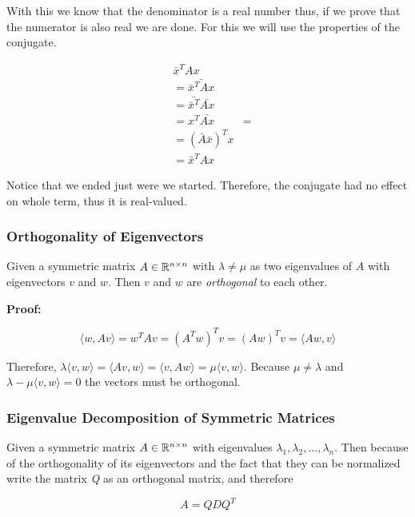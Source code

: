 With this we know that the denominator is a real number thus, if we prove that the numerator is also real 
we are done. For this we will use the properties of the conjugate.

\begin{align*}
    &\bar{x}^T A x\\
    &=\bar{\bar{x}^T A x} \\
    &=\bar{\bar{x}^T} \bar{Ax} \\
    &=x^T \bar{Ax} &= \\
    &=(\bar{A}\bar{x})^T x \\
    &=\bar{x}^T A  x 
\end{align*}

Notice that we ended just were we started. Therefore, the conjugate had no effect on whole term, thus 
it is real-valued.

\QED

\subsubsection{Orthogonality of Eigenvectors}

Given a symmetric matrix \(A \in \mathbb{R}^{n \times n}\) with \(\lambda \ne \mu \) as two eigenvalues of 
\(A\) with eigenvectors \(v\) and \(w\). Then \(v\) and \(w\) are \emph{orthogonal} to each other.
\vspace{\baselineskip}

\textbf{Proof:}

\[
    \langle w, Av \rangle = w^{T} Av = (A^T w)^T v = (Aw)^T v = \langle Aw, v\rangle
\]

Therefore, \(\lambda \langle v, w \rangle = \langle Av, w \rangle = \langle v, Aw\rangle 
= \mu \langle v, w \rangle\). Because \(\mu \ne \lambda\) and \(\lambda - \mu \langle v, w\rangle = 0\)
the vectors must be orthogonal.

\QED

\subsubsection{Eigenvalue Decomposition of Symmetric Matrices}

Given a symmetric matrix \(A \in \mathbb{R}^{n \times n}\) with eigenvalues 
\(\lambda_1, \lambda_2, \dots, \lambda_n\). Then because of the orthogonality of its eigenvectors and 
the fact that they can be normalized write the matrix \emph{Q} as an orthogonal matrix, and therefore

\[
    A = Q D Q^T
\]


